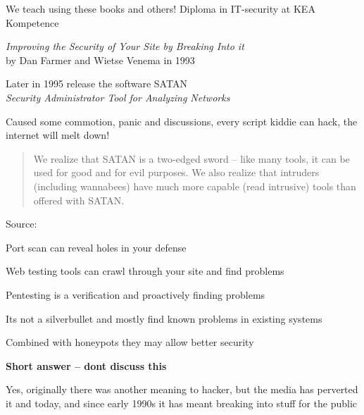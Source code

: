 \documentclass[Screen16to9,17pt]{foils}
\begin{document}
We teach using these books and others! Diploma in IT-security at KEA Kompetence\\





\begin{list1}
\item \emph{Improving the Security of Your Site by Breaking Into it}\\ by
Dan Farmer and Wietse Venema in 1993
\item Later in 1995 release the software SATAN\\
\emph{Security Administrator Tool for Analyzing Networks}
\item Caused some commotion, panic and discussions, every script kiddie can hack, the internet will melt down!
\vskip 5mm
\begin{quote}
We realize that SATAN is a two-edged sword -- like
many tools, it can be used for good and for evil
purposes. We also realize that intruders (including
wannabees) have much more capable (read intrusive)
tools than offered with SATAN.
\end{quote}
\end{list1}

\vskip 1cm
Source:



\begin{list1}
\item Port scan can reveal holes in your defense
\item Web testing tools can crawl through your site and find problems
\item Pentesting is a verification and proactively finding problems
\item Its not a silverbullet and mostly find known problems in existing systems
\item Combined with honeypots they may allow better security
\end{list1}



{\bfseries Short answer -- dont discuss this}

Yes, originally there was another meaning to hacker, but the media has perverted it and today, and since early 1990s it has meant breaking into stuff for the public
\end{document}
